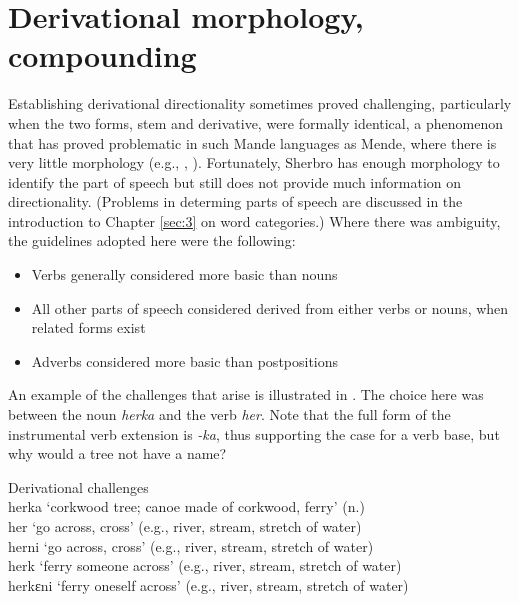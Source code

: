\chapter{Derivational morphology, compounding}
\hypertarget{Toc115517804}{}\label{ch:7}
Establishing derivational directionality sometimes proved challenging, particularly when the two forms, stem and derivative, were formally identical, a phenomenon that has proved problematic in such Mande languages as Mende, where there is very little morphology (e.g., \citealt{Dwyer1989}, \citealt{Innes1962}). Fortunately, Sherbro has enough morphology to identify the part of speech but still does not provide much information on directionality. (Problems in determing parts of speech are discussed in the introduction to Chapter \ref{sec:3} on word categories.) Where there was ambiguity, the guidelines adopted here were the following:

\begin{itemize}
\item Verbs generally considered more basic than nouns
\item All other parts of speech considered derived from either verbs or nouns, when related forms exist

\item Adverbs considered more basic than postpositions
\end{itemize}

An example of the challenges that arise is illustrated in . The choice here was between the noun \textit{herka} and the verb \textit{her}. Note that the full form of the instrumental verb extension is \textit{{}-ka}, thus supporting the case for a verb base, but why would a tree not have a name?

\TabPositions{2cm,4cm,6cm,8cm}
\ea%
    \label{ex:171}
    Derivational challenges\\
herka \tab ‘corkwood tree; canoe made of corkwood, ferry' (n.)\\
\vspace{6pt}
her \tab ‘go across, cross' (e.g., river, stream, stretch of water)\\
herni \tab ‘go across, cross' (e.g., river, stream, stretch of water)\\
herk \tab ‘ferry someone across' (e.g., river, stream, stretch of water)\\
herkɛni \tab ‘ferry oneself across' (e.g., river, stream, stretch of water)\\
\z

